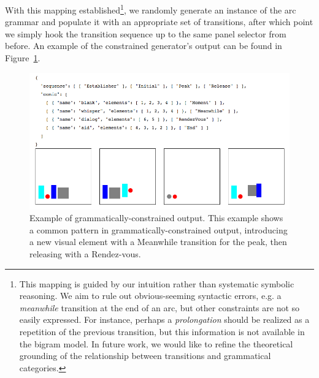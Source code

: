 
\newcommand{\caveat}{
This mapping is guided by our intuition rather than 
systematic symbolic reasoning. We aim to rule out obvious-seeming
syntactic errors, e.g. a \emph{meanwhile} transition at the end of an arc, but
other constraints are not so easily expressed. For instance, perhaps a
\emph{prolongation} should be realized as a repetition of the previous
transition, but this information is not available in the bigram model. In
future work, we would like to refine the theoretical grounding of the
relationship between transitions and grammatical categories.}

With this mapping established\footnote{\caveat}, we randomly generate an instance of the
arc grammar and populate it with an appropriate set of transitions, after
which point we simply hook the transition sequence up to the same panel
selector from before. An example of the constrained generator's output can 
be found in Figure~\ref{fig:outgood}. %

\begin{figure}[tb]
\centering
\includegraphics[width=0.8\columnwidth]{output-constrained-canonical.png}
\caption{Example of grammatically-constrained output.
This example shows a common pattern in grammatically-constrained output,
introducing a new visual element with a Meanwhile transition for the peak,
then releasing with a Rendez-vous.
}
\label{fig:outgood}
\end{figure}

%



